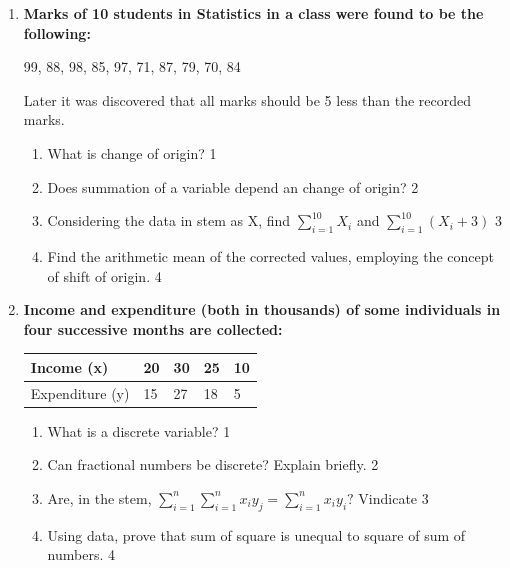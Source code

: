\documentclass[a4paper,oneside]{book}
\begin{document}
\begin{enumerate}
   \item
	  \textbf{Marks of 10 students in Statistics in a class were found to be the following:} 
	 
	 \begin{center} 
	  99, 88, 98, 85, 97, 71, 87, 79, 70, 84
	  
	  \end{center}
	  
	  Later it was discovered that all marks should be 5 less than the recorded marks. 
  
  \begin{enumerate}
    \item
	What is change of origin? \hfill 1
    \item
	Does summation of a variable depend an change of origin?  \hfill 2
    \item  
	Considering the data in stem as X, find $\displaystyle \sum_{i=1}^{10} X_i$ and $\displaystyle \sum_{i=1}^{10} (X_i+3)$ \hfill 3
    \item
	Find the arithmetic mean of the corrected values, employing the concept of shift of origin. \hfill 4
  \end{enumerate}

  \item
  \textbf{Income and expenditure (both in thousands) of some individuals in four successive months are collected:}
 
\begin{table}[h]
 \begin{center}
\begin{tabular}{l|l|l|l|l}

Income (x)  & 20 & 30 & 25 & 10 \\ \hline
Expenditure (y) & 15  & 27  & 18 & 5 \\ 
\end{tabular}
\end{center}
\end{table}


  \begin{enumerate}
    \item
	What is a discrete variable? \hfill 1
    \item
    	Can fractional numbers be discrete? Explain briefly.  \hfill 2
    \item
    	Are, in the stem, $\displaystyle \sum_{i=1}^{n} \sum_{i=1}^{n} x_iy_j = \sum_{i=1}^{n} x_iy_i?$ Vindicate \hfill 3
     \item
     	Using data, prove  that sum of square is unequal to square of sum of numbers. \hfill 4
  \end{enumerate}
  

\end{enumerate}
\end{document}
